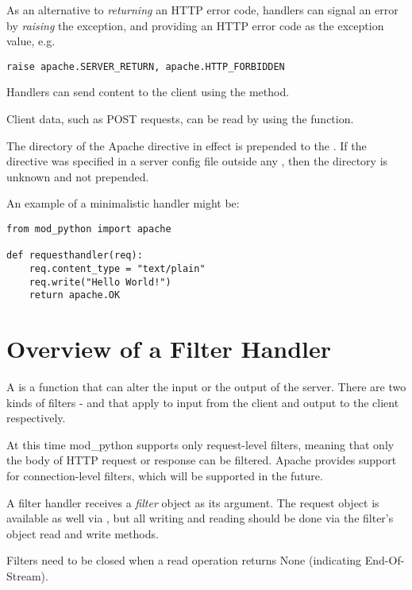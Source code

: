 As an alternative to \emph{returning} an HTTP error code, handlers can
signal an error by \emph{raising} the 
exception, and providing an HTTP error code as the exception value,
e.g.

\begin{verbatim}
raise apache.SERVER_RETURN, apache.HTTP_FORBIDDEN
\end{verbatim}
              
Handlers can send content to the client using the 
method. 

Client data, such as POST requests, can be read by using the
 function.

 The directory of the Apache  
directive in effect is prepended to the . If the
directive was specified in a server config file outside any
, then the directory is unknown and not prepended.

An example of a minimalistic handler might be: 

\begin{verbatim}
from mod_python import apache

def requesthandler(req):
    req.content_type = "text/plain"
    req.write("Hello World!")
    return apache.OK
\end{verbatim}

\section{Overview of a Filter Handler\label{pyapi-filter}}

A  is a function that can alter the input or the
output of the server. There are two kinds of filters -  and
 that apply to input from the client and output to the
client respectively.

At this time mod_python supports only request-level filters, meaning
that only the body of HTTP request or response can be filtered. Apache
provides support for connection-level filters, which will be supported
in the future.

A filter handler receives a \emph{filter} object as its argument. The
request object is available as well via , but all
writing and reading should be done via the filter's object read and
write methods.

Filters need to be closed when a read operation returns None 
(indicating End-Of-Stream).

